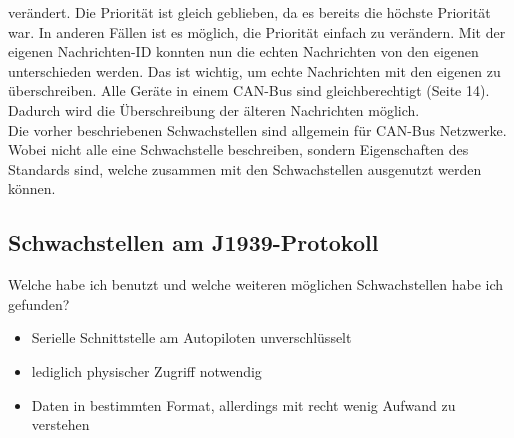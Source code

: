 verändert. Die Priorität ist gleich geblieben, da es bereits die höchste Priorität war. In anderen Fällen ist es möglich, die Priorität
einfach zu verändern. Mit der eigenen Nachrichten-ID konnten nun die 
echten Nachrichten von den eigenen unterschieden werden. Das ist wichtig, um echte Nachrichten mit den eigenen zu überschreiben. 
Alle Geräte in einem CAN-Bus sind gleichberechtigt\cite{Voss2008} (Seite 14). Dadurch wird die Überschreibung der älteren Nachrichten möglich.\\
Die vorher beschriebenen Schwachstellen sind allgemein für CAN-Bus Netzwerke. Wobei nicht alle eine Schwachstelle beschreiben, sondern 
Eigenschaften des Standards sind, welche zusammen mit den Schwachstellen ausgenutzt werden können.\\

\subsection{Schwachstellen am J1939-Protokoll}


Welche habe ich benutzt und welche weiteren möglichen Schwachstellen habe ich gefunden?
\begin{itemize}
    \item Serielle Schnittstelle am Autopiloten unverschlüsselt
    \item lediglich physischer Zugriff notwendig
    \item Daten in bestimmten Format, allerdings mit recht wenig Aufwand zu verstehen
\end{itemize}

